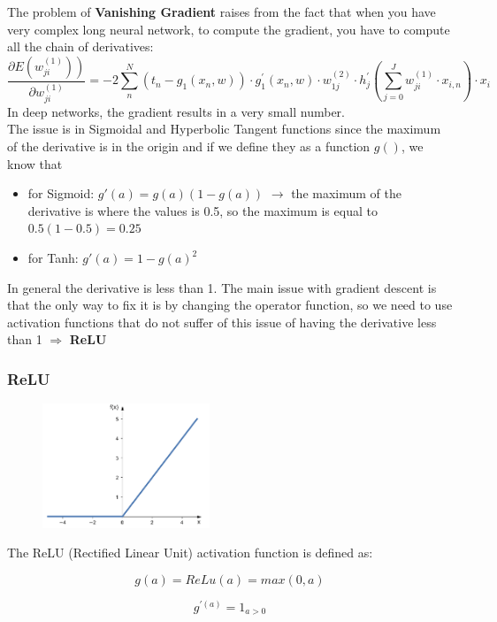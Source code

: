 The problem of \textbf{Vanishing Gradient} raises from the fact that when you have very complex long neural network, to compute the gradient, you have to compute all the chain of derivatives:
$$
\frac{\left.\partial E\left(w_{j i}^{(1)}\right)\right)}{\partial w_{j i}^{(1)}}=-2 \sum_{n}^{N}\left(t_{n}-g_{1}\left(x_{n}, w\right)\right) \cdot g_{1}^{\prime}\left(x_{n}, w\right) \cdot w_{1 j}^{(2)} \cdot h_{j}^{\prime}\left(\sum_{j=0}^{J} w_{j i}^{(1)} \cdot x_{i, n}\right) \cdot x_{i}
$$
In deep networks, the gradient results in a very small number. \\
The issue is in Sigmoidal and Hyperbolic Tangent functions since the maximum of the derivative is in the origin and if we define they as a function $g()$, we know that 
\begin{itemize}
    \item for Sigmoid: $g'(a) = g(a)(1-g(a))$ $\rightarrow$ the maximum of the derivative is where the values is 0.5, so the maximum is equal to $0.5 (1 - 0.5) = 0.25$
    \item for Tanh: $g'(a) = 1 - g(a)^2$
\end{itemize}{}

In general the derivative is less than 1. The main issue with gradient descent is that the only way to fix it is by changing the operator function, so we need to use activation functions that do not suffer of this issue of having the derivative less than 1 $\Rightarrow$ \textbf{ReLU}

\subsubsection{ReLU}
\begin{figure}
    \includegraphics[width=5cm]{images/relu.png}
\end{figure}  

The ReLU (Rectified Linear Unit) activation function is defined as:

$$ 
g(a) = ReLu(a) = max(0,a) 
$$ 

$$
g^{\prime (a)} = 1_{a>0}
$$ \\ \\

